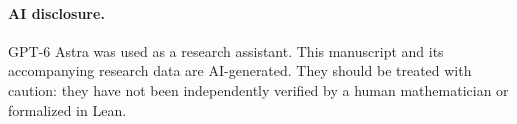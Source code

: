 \documentclass[11pt]{article}
\begin{document}




















\clearpage
\begingroup\small


\endgroup
\paragraph{AI disclosure.} GPT-6 Astra was used as a research assistant.
This manuscript and its accompanying research data are AI-generated. They should be treated with caution: they have not been independently verified by a human mathematician or formalized in Lean.
\end{document}
